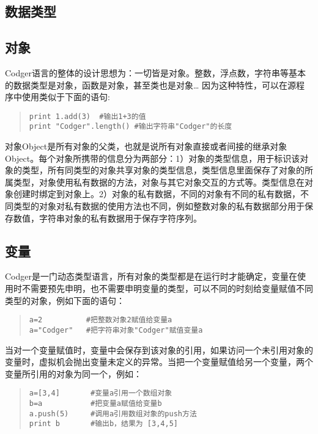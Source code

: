 \documentclass[a4paper,10pt]{article}
\begin{document}
\begin{CJK}{UTF8}{gbsn}
\tableofcontents
\newpage
\section{数据类型}
\subsection{对象}
Codger语言的整体的设计思想为：一切皆是对象。整数，浮点数，字符串等基本的数据类型是对象，函数是对象，甚至类也是对象\ldots{} 因为这种特性，可以在源程序中使用类似于下面的语句:
\begin{quote}
\begin{verbatim}
print 1.add(3)  #输出1+3的值
print "Codger".length() #输出字符串"Codger"的长度
\end{verbatim}
\end{quote}
对象Object是所有对象的父类，也就是说所有对象直接或者间接的继承对象Object。每个对象所携带的信息分为两部分：1）对象的类型信息，用于标识该对象的类型，所有同类型的对象共享对象的类型信息，类型信息里面保存了对象的所属类型，对象使用私有数据的方法，对象与其它对象交互的方式等。类型信息在对象创建时绑定到对象上。2）对象的私有数据，不同的对象有不同的私有数据，不同类型的对象对私有数据的使用方法也不同，例如整数对象的私有数据部分用于保存数值，字符串对象的私有数据用于保存字符序列。
\subsection{变量}
Codger是一门动态类型语言，所有对象的类型都是在运行时才能确定，变量在使用时不需要预先申明，也不需要申明变量的类型，可以不同的时刻给变量赋值不同类型的对象，例如下面的语句：
\begin{quote}
\begin{verbatim}
a=2          #把整数对象2赋值给变量a
a="Codger"   #把字符串对象"Codger"赋值变量a 
\end{verbatim}
\end{quote}
当对一个变量赋值时，变量中会保存到该对象的引用，如果访问一个未引用对象的变量时，虚拟机会抛出变量未定义的异常。当把一个变量赋值给另一个变量，两个变量所引用的对象为同一个，例如：
\begin{quote}
\begin{verbatim}
a=[3,4]       #变量a引用一个数组对象
b=a           #把变量a赋值给变量b
a.push(5)     #调用a引用数组对象的push方法
print b       #输出b，结果为 [3,4,5]
\end{verbatim}
\end{quote}

\end{CJK}
\end{document}
